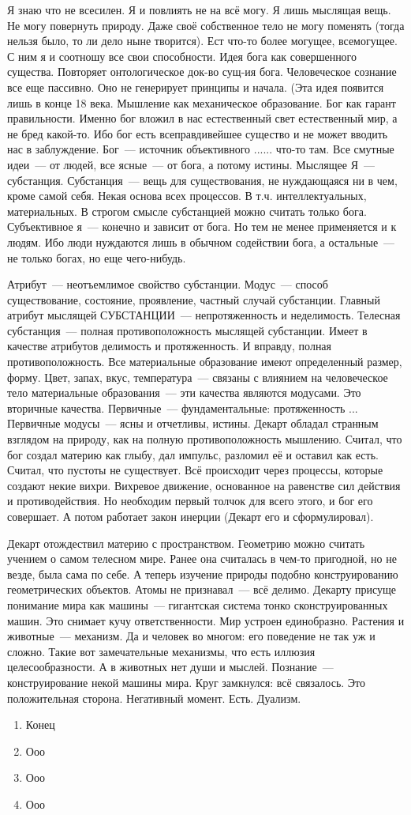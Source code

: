 Я знаю что не всесилен. Я и повлиять не на всё могу. Я лишь мыслящая вещь. Не могу повернуть природу. Даже своё собственное тело не могу поменять (тогда нельзя было, то ли дело ныне творится). Ест что-то более могущее, всемогущее. С ним я и соотношу все свои способности. Идея бога как совершенного существа. Повторяет онтологическое док-во сущ-ия бога.
Человеческое сознание все еще пассивно. Оно не генерирует принципы и начала. (Эта идея появится лишь в конце 18 века. Мышление как механическое образование. Бог как гарант правильности. Именно бог вложил в нас естественный свет естественный мир, а не бред какой-то. Ибо бог есть всеправдивейшее существо и не может вводить нас в заблуждение. Бог~--- источник объективного ...... что-то там.
Все смутные идеи~--- от людей, все ясные~--- от бога, а потому истины. Мыслящее Я~--- субстанция.
Субстанция~--- вещь для существования, не нуждающаяся ни в чем, кроме самой себя. Некая основа всех процессов. В т.ч. интеллектуальных, материальных. В строгом смысле субстанцией можно считать только бога. Субъективное я~--- конечно и зависит от бога. Но тем не менее применяется и к людям. Ибо люди нуждаются лишь в обычном содействии бога, а остальные~--- не только богах, но еще чего-нибудь.

Атрибут~--- неотъемлимое свойство субстанции. Модус~--- способ существование, состояние, проявление, частный случай субстанции. Главный атрибут мыслящей СУБСТАНЦИИ~--- непротяженность и неделимость. Телесная субстанция~--- полная противоположность мыслящей субстанции. Имеет в качестве атрибутов делимость и протяженность. И вправду, полная противоположность. Все материальные образование имеют определенный размер, форму. Цвет, запах, вкус, температура~--- связаны с влиянием на человеческое тело материальные образования~--- эти качества являются модусами. Это вторичные качества. Первичные~--- фундаментальные: протяженность ...
Первичные модусы~--- ясны и отчетливы, истины.
Декарт обладал странным взглядом на природу, как на полную противоположность мышлению. Считал, что бог создал материю как глыбу, дал импульс, разломил её и оставил как есть. Считал, что пустоты не существует. Всё происходит через процессы, которые создают некие вихри. Вихревое движение, основанное на равенстве сил действия и противодействия. Но необходим первый толчок для всего этого, и бог его совершает. А потом работает закон инерции (Декарт его и сформулировал).

Декарт отождествил материю с пространством. Геометрию можно считать учением о самом телесном мире. Ранее она считалась в чем-то пригодной, но не везде, была сама по себе. А теперь изучение природы подобно конструированию геометрических объектов. Атомы не признавал~--- всё делимо. Декарту присуще понимание мира как машины~--- гигантская система тонко сконструированных машин. Это снимает кучу ответственности. Мир устроен единобразно. Растения и животные~--- механизм. Да и человек во многом: его поведение не так уж и сложно. Такие вот замечательные механизмы, что есть иллюзия целесообразности. А в животных нет души и мыслей. Познание~--- конструирование некой машины мира. Круг замкнулся: всё связалось. Это положительная сторона.
Негативный момент. Есть. Дуализм.

\begin{enumerate}
	\item Конец
	\item Ооо
	\item Ооо
	\item Ооо
\end{enumerate}
